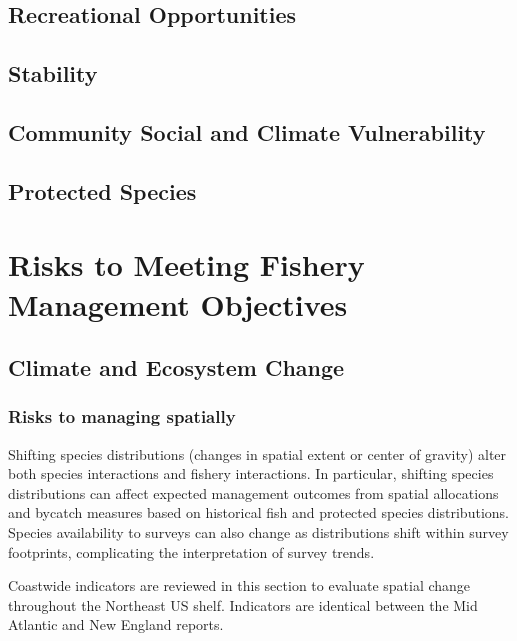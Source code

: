 \documentclass[
  10pt,
]{article}
\begin{document}
\subsection{Recreational Opportunities}\label{recreational-opportunities}

\subsection{Stability}\label{stability}

\subsection{Community Social and Climate Vulnerability}\label{community-social-and-climate-vulnerability}

\subsection{Protected Species}\label{protected-species}

\section{Risks to Meeting Fishery Management Objectives}\label{risks-to-meeting-fishery-management-objectives}

\subsection{Climate and Ecosystem Change}\label{climate-and-ecosystem-change}

\subsubsection{Risks to managing spatially}\label{risks-to-managing-spatially}

Shifting species distributions (changes in spatial extent or center of gravity) alter both species interactions and fishery interactions. In particular, shifting species distributions can affect expected management outcomes from spatial allocations and bycatch measures based on historical fish and protected species distributions. Species availability to surveys can also change as distributions shift within survey footprints, complicating the interpretation of survey trends.

Coastwide indicators are reviewed in this section to evaluate spatial change throughout the Northeast US shelf. Indicators are identical between the Mid Atlantic and New England reports.
\end{document}
